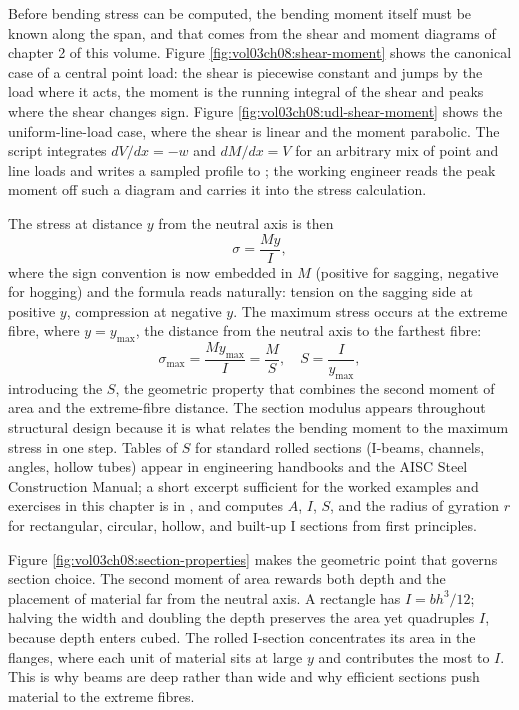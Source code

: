 

Before bending stress can be computed, the bending moment itself must
be known along the span, and that comes from the shear and moment
diagrams of chapter 2 of this volume. Figure
\ref{fig:vol03ch08:shear-moment} shows the canonical case of a central
point load: the shear is piecewise constant and jumps by the load
where it acts, the moment is the running integral of the shear and
peaks where the shear changes sign. Figure
\ref{fig:vol03ch08:udl-shear-moment} shows the uniform-line-load case,
where the shear is linear and the moment parabolic. The script
 integrates $dV/dx=-w$ and $dM/dx=V$ for an
arbitrary mix of point and line loads and writes a sampled profile to
; the working engineer reads the
peak moment off such a diagram and carries it into the stress
calculation.





The stress at distance $y$ from the neutral axis is then
\[
\sigma = \frac{My}{I},
\]
where the sign convention is now embedded in $M$ (positive for sagging,
negative for hogging) and the formula reads naturally: tension on the
sagging side at positive $y$, compression at negative $y$. The maximum
stress occurs at the extreme fibre, where $y = y_{\max}$, the distance
from the neutral axis to the farthest fibre:
\[
\sigma_{\max} = \frac{M y_{\max}}{I} = \frac{M}{S}, \quad S = \frac{I}{
y_{\max}},
\]
introducing the  $S$, the geometric property
that combines the second moment of area and the extreme-fibre
distance. The section modulus appears throughout structural design
because it is what relates the bending moment to the maximum stress in
one step. Tables of $S$ for standard rolled sections (I-beams, channels,
angles, hollow tubes) appear in engineering handbooks and the AISC
Steel Construction Manual; a short excerpt sufficient for the worked
examples and exercises in this chapter is in
, and 
computes $A$, $I$, $S$, and the radius of gyration $r$ for rectangular,
circular, hollow, and built-up I sections from first principles.

Figure \ref{fig:vol03ch08:section-properties} makes the geometric point
that governs section choice. The second moment of area rewards both
depth and the placement of material far from the neutral axis. A
rectangle has $I=bh^3/12$; halving the width and doubling the depth
preserves the area yet quadruples $I$, because depth enters cubed. The
rolled I-section concentrates its area in the flanges, where each unit
of material sits at large $y$ and contributes the most to $I$. This is
why beams are deep rather than wide and why efficient sections push
material to the extreme fibres.

